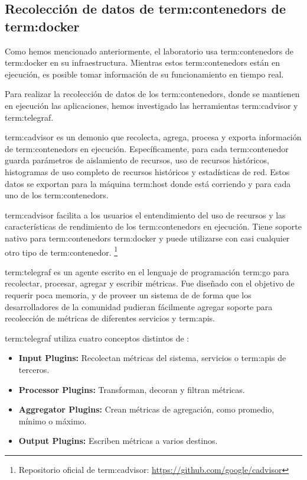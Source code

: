 \subsection{Recolección de datos de \glspl{term:contenedor} de \gls{term:docker}}
\label{contenedores}

Como hemos mencionado anteriormente, el laboratorio usa \glspl{term:contenedor}
de \gls{term:docker} en su infraestructura. Mientras estos
\glspl{term:contenedor} están en ejecución, es posible tomar información de su
funcionamiento en tiempo real.

Para realizar la recolección de datos de los \glspl{term:contenedor}, donde se
mantienen en ejecución las aplicaciones, hemos investigado las herramientas
\gls{term:cadvisor} y \gls{term:telegraf}.

\gls{term:cadvisor} es un demonio que recolecta, agrega,
procesa y exporta información de \glspl{term:contenedor} en ejecución.
Específicamente, para cada \gls{term:contenedor} guarda parámetros de
aislamiento de recursos, uso de recursos históricos, histogramas de uso
completo de recursos históricos y estadísticas de red. Estos datos se exportan
para la máquina \gls{term:host} donde está corriendo y para cada uno de los
\glspl{term:contenedor}.

\gls{term:cadvisor} facilita a los usuarios el entendimiento del uso de
recursos y las características de rendimiento de los \glspl{term:contenedor} en
ejecución.  Tiene soporte nativo para \glspl{term:contenedor} \gls{term:docker}
y puede utilizarse con casi cualquier otro tipo de \gls{term:contenedor}.
\footnote{Repositorio oficial de \gls{term:cadvisor}: \url{https://github.com/google/cadvisor}}

\gls{term:telegraf} es un agente escrito en el lenguaje de programación \gls{term:go} para
recolectar, procesar, agregar y escribir métricas. Fue diseñado con el objetivo
de requerir poca memoria, y de proveer un sistema de  de forma que
los desarrolladores de la comunidad pudieran fácilmente agregar soporte para
recolección de métricas de diferentes servicios y \glspl{term:api}.

\gls{term:telegraf} utiliza cuatro conceptos distintos de :

\begin{itemize}

  \item \textbf{Input Plugins:}
  Recolectan métricas del sistema, servicios o \glspl{term:api} de terceros.

  \item \textbf{Processor Plugins:}
  Transforman, decoran y filtran métricas.

  \item \textbf{Aggregator Plugins:}
  Crean métricas de agregación, como promedio, mínimo o máximo.

  \item \textbf{Output Plugins:}
  Escriben métricas a varios destinos.

\end{itemize}

